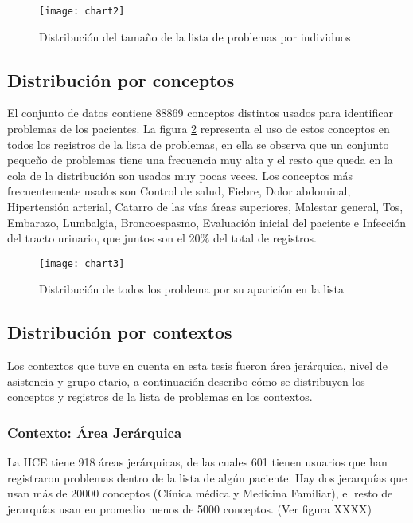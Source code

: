 \begin{figure}[t]
\caption{Distribución del tamaño de la lista de problemas por individuos}
\label{fig:listaIndividuos}
\centering
\texttt{[image: chart2]}
\end{figure}

\subsection{Distribución por conceptos}
El conjunto de datos contiene \num{88869} conceptos distintos usados para identificar problemas de los pacientes. La figura \ref{fig:listaProblemas} representa el uso de estos conceptos en todos los registros de la lista de problemas, en ella se observa que un conjunto pequeño de problemas tiene una frecuencia muy alta y el resto que queda en la cola de la distribución son usados muy pocas veces. Los conceptos más frecuentemente usados son Control de salud, Fiebre, Dolor abdominal,  Hipertensión arterial, Catarro de las vías áreas superiores, Malestar general, Tos, Embarazo, Lumbalgia, Broncoespasmo, Evaluación inicial del paciente e Infección del tracto urinario, que juntos son el \num{20}\% del total de registros. 

\begin{figure}[t]
\caption{Distribución de todos los problema por su aparición en la lista}
\label{fig:listaProblemas}
\centering
\texttt{[image: chart3]}
\end{figure}

\subsection{Distribución por contextos}

Los contextos que tuve en cuenta en esta tesis fueron área jerárquica, nivel de asistencia y grupo etario, a continuación describo cómo se distribuyen los conceptos y registros de la lista de problemas en los contextos.

\subsubsection{Contexto: Área Jerárquica}
La \acrshort{HCE} tiene 918 áreas jerárquicas, de las cuales 601 tienen usuarios que han registraron problemas dentro de la lista de algún paciente. Hay dos jerarquías que usan más de \num{20000} conceptos (Clínica médica y Medicina Familiar), el resto de jerarquías usan en promedio menos de 5000 conceptos. (Ver figura XXXX)


